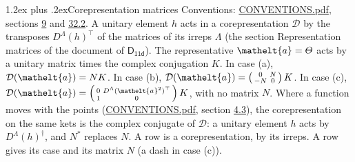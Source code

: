 \documentclass[10pt,a4paper]{article}
\makeatletter
\renewcommand\section{\@startsection{section}{1}{\z@}{-3ex plus -1ex minus -.2ex}%
  {1.2ex plus .2ex}{\normalfont\large\sffamily\bfseries\color{parttitle}}}
\numberwithin{equation}{section}
\newcommand{\eltfont}[1]{{\let\sigma\eltsigma\mathelt{#1}}}
\newcommand{\grp}[1]{\mathsf{#1}}
\newcommand{\elt}[1]{\eltfont{#1}}
\makeatother
\begin{document}
\section{Corepresentation matrices}\label{s:corep_matrices}
Conventions: \href{../../CONVENTIONS.pdf}{CONVENTIONS.pdf}, sections \href{../../../rotation/CONVENTIONS.pdf\#conv.9}{9} and \href{../../CONVENTIONS.pdf\#conv.32.2}{32.2}.
A unitary element $h$ acts in a corepresentation $\mathcal{D}$ by the transposes $D^{\Lambda}(h)^{\top}$ of the matrices of its irreps $\Lambda$ (the section Representation matrices of the document of \href{../../../rotation/data/pdf/D11d.pdf}{$\grp{D_{11d}}$}). The representative $\elt{a} = \varTheta$ acts by a unitary matrix times the complex conjugation $K$.
In case (a), $\mathcal{D}(\elt{a}) = NK$. In case (b), $\mathcal{D}(\elt{a}) = \left(\begin{smallmatrix} 0 & N \\ -N & 0 \end{smallmatrix}\right) K$. In case (c), $\mathcal{D}(\elt{a}) = \left(\begin{smallmatrix} 0 & D^{\Lambda}(\elt{a}^2)^{\top} \\ 1 & 0 \end{smallmatrix}\right) K$, with no matrix $N$.
Where a function moves with the points (\href{../../CONVENTIONS.pdf}{CONVENTIONS.pdf}, section \href{../../../rotation/CONVENTIONS.pdf\#conv.4.3}{4.3}), the corepresentation on the same kets is the complex conjugate of $\mathcal{D}$: a unitary element $h$ acts by $D^{\Lambda}(h)^{\dagger}$, and $N^{*}$ replaces $N$.
A row is a corepresentation, by its irreps. A row gives its case and its matrix $N$ (a dash in case (c)).
\end{document}
